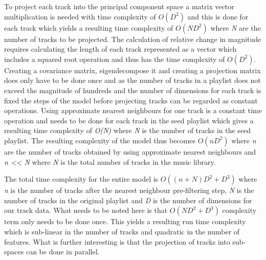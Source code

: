 \documentclass[a4paper,11pt]{kth-mag}
\begin{document}
To project each track into the principal component space a matrix vector multiplication is needed with time complexity of $O(D^2)$ and this is done for each track which yields a resulting time complexity of $O(ND^2)$ where \textit{N} are the number of tracks to be projected. The calculation of relative change in magnitude requires calculating the length of each track represented as a vector which includes a squared root operation and thus has the time complexity of $O(D^2)$. Creating a covariance matrix, eigendecompose it and creating a projection matrix does only have to be done once and as the number of tracks in a playlist does not exceed the magnitude of hundreds and the number of dimensions for each track is fixed the steps of the model before projecting tracks can be regarded as constant operations. Using approximate nearest neighbours for one track is a constant time operation and needs to be done for each track in the seed playlist which gives a resulting time complexity of \textit{O(N)} where \textit{N} is the number of tracks in the seed playlist. The resulting complexity of the model thus becomes $O(nD^2)$ where \textit{n} are the number of tracks obtained by using approximate nearest neighbours and \textit{n << N} where \textit{N} is the total number of tracks in the music library. 

The total time complexity for the entire model is $O((n+N)D^2 + D^3)$ where \textit{n} is the number of tracks after the nearest neighbour pre-filtering step, \textit{N} is the number of tracks in the original playlist and \textit{D} is the number of dimensions for our track data. What needs to be noted here is that $O(ND^2 + D^3)$ complexity term only needs to be done once. This yields a resulting run time complexity which is sub-linear in the number of tracks and quadratic in the number of features. What is further interesting is that the projection of tracks into sub-spaces can be done in parallel. 
 
\end{document}
